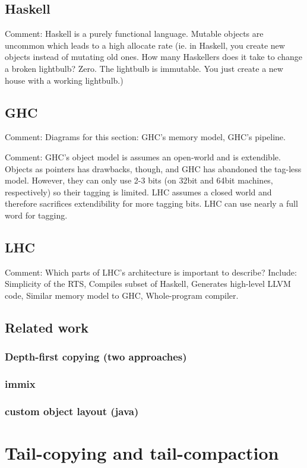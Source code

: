 \documentclass[a4paper,oneside]{memoir}
\newcommand{\makecomment}[1]{{\color{red} Comment: #1}}
\begin{document}
\section{Haskell}
\makecomment{Haskell is a purely functional language.\cite{HaskellReport} Mutable objects are
uncommon which leads to a high allocate rate (ie. in Haskell, you create new
objects instead of mutating old ones. How many Haskellers does it take to
change a broken lightbulb? Zero. The lightbulb is immutable. You just create
a new house with a working lightbulb.)}

\section{GHC}
\makecomment{Diagrams for this section: GHC's memory model, GHC's pipeline.}

\makecomment{GHC's object model is assumes an open-world and is extendible.
Objects as pointers has drawbacks, though, and GHC has abandoned the tag-less
model. However, they can only use 2-3 bits (on 32bit and 64bit machines,
respectively) so their tagging is limited. LHC assumes a closed world and therefore
sacrifices extendibility for more tagging bits. LHC can use nearly a full word
for tagging.}

\section{LHC}
\makecomment{Which parts of LHC's architecture is important to describe? \cite{LHC}
Include: Simplicity of the RTS, Compiles subset of Haskell, Generates high-level
LLVM code, Similar memory model to GHC, Whole-program compiler.}

\section{Related work}
\subsection{Depth-first copying (two approaches)}
\subsection{immix}
\subsection{custom object layout (java)}

\chapter{Tail-copying and tail-compaction}
\end{document}
